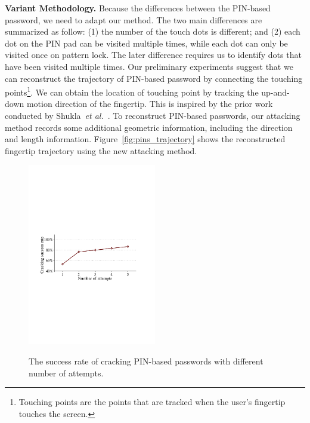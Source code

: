         \vspace{2mm}
        \noindent \textbf{Variant Methodology.} Because the differences
        between the PIN-based password, we need to adapt our method. The two
        main differences are summarized as follow: (1) the number of the
        touch dots is different; and (2) each dot on the PIN pad can be
        visited multiple times, while each dot can only be visited once on
        pattern lock. The later difference requires us to identify dots that
        have been visited multiple times.  Our preliminary experiments
        suggest that we can reconstruct the trajectory of PIN-based password
        by connecting the touching points\footnote{Touching points are the
        points that are tracked when the user's fingertip touches the screen.}. We
        can obtain the location of touching point by tracking the up-and-down
        motion direction of the fingertip. This is inspired by the prior work
        conducted by Shukla~\emph{et al.}~\cite{shukla2014beware}. To reconstruct
        PIN-based passwords, our attacking method records some additional
        geometric information, including the direction and length
        information. Figure~\ref{fig:pins_trajectory} shows the reconstructed
        fingertip trajectory using the new attacking method.

    \begin{figure}[!t]
        \centering
        \includegraphics[width=0.5\textwidth]{fig/pin_results}\\
        \caption{The success rate of cracking PIN-based passwords with different number of attempts.}
        \label{fig:pin_results}
    \end{figure}

